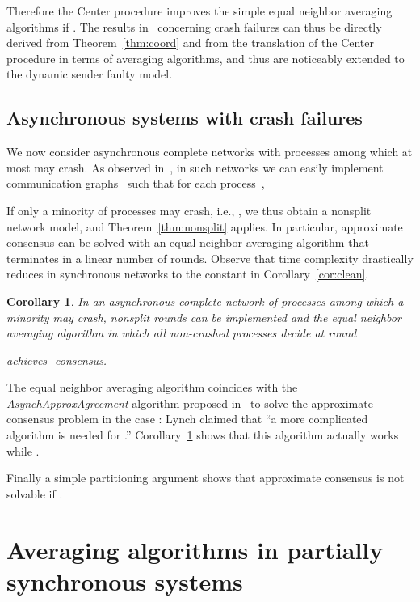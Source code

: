 \documentclass[a4paper]{article}
\theoremstyle{newthm}
\newtheorem{cor}[thm]{Corollary}
\begin{document}
Therefore the Center procedure improves the simple equal neighbor averaging algorithms if .  
The results in~\cite{Fek90} concerning crash failures can thus be directly derived from
	Theorem~\ref{thm:coord} and  from the translation of the Center procedure in terms of averaging 
	algorithms, and thus are noticeably extended to the dynamic sender faulty model.


\subsection{Asynchronous systems with crash failures}

We now consider asynchronous complete networks with  processes among which at most
	 may crash.
As observed in~\cite{CS09}, in such networks we can easily  implement 
	 communication graphs~ such that for each process~,
	
If only a minority of processes may crash, i.e., , we thus obtain a nonsplit network model,
	and Theorem~\ref{thm:nonsplit} applies.	
In particular, approximate consensus can be solved with an equal neighbor averaging algorithm that 
	terminates in a linear number of  rounds.	
Observe that   time complexity drastically reduces in synchronous networks to the constant 
	in Corollary~\ref{cor:clean}.

\begin{cor}\label{cor:asynch}
In an asynchronous complete network of  processes among which a minority may crash, 
	nonsplit rounds can be implemented and the equal neighbor averaging 
	algorithm 	in which all non-crashed processes decide at  round
	 
	achieves -consensus.
\end{cor}

The equal neighbor averaging algorithm  coincides with the {\em AsynchApproxAgreement}
	algorithm proposed in~\cite{Lyn96} to solve the approximate consensus problem in the
	case : Lynch claimed that ``a more complicated algorithm is needed for .''
Corollary~\ref{cor:asynch} shows that this algorithm actually works while  . 

Finally a simple partitioning argument shows that approximate consensus is not 
	solvable if .




\section{Averaging algorithms in partially synchronous systems}
\end{document}
